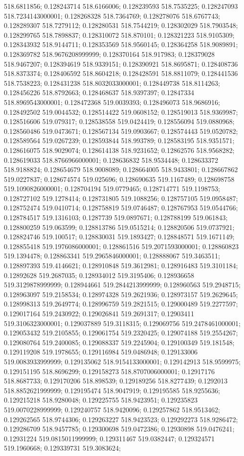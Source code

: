 518.6811856; 0.128243714 518.6166006; 0.128239593 518.7535225; 0.128247093 518.7234143000001; 0.128268328 518.7364769; 0.128278076 518.6767743; 0.128289307 518.7279112; 0.128280531 518.7544219; 0.128302029 518.7903548; 0.128299765 518.7898837; 0.128310072 518.870101; 0.128321223 518.9105309; 0.128343932 518.9144711; 0.128353569 518.9560145; 0.128364258 518.9089891; 0.128369782 518.9676208999999; 0.128370164 518.917983; 0.128379028 518.9467207; 0.128394619 518.9339151; 0.128390921 518.8695871; 0.128408736 518.8373374; 0.128406592 518.8604218; 0.128428591 518.8811079; 0.128441536 518.7538223; 0.128431238 518.8032033000001; 0.128449738 518.8114263; 0.128456226 518.8792663; 0.128468637 518.9397397; 0.12847334 518.8969543000001; 0.128472368 519.0039393; 0.128496073 518.9686916; 0.128492502 519.0044532; 0.128514422 519.0608152; 0.128519013 518.9369987; 0.128516606 519.079317; 0.128538558 519.0424419; 0.128556094 519.0880968; 0.128560486 519.0473671; 0.128567134 519.0903667; 0.128574443 519.0520782; 0.128589564 519.0267239; 0.128593844 518.993789; 0.128583195 518.9351571; 0.128616075 518.9029074; 0.128614138 518.9231652; 0.12862576 518.9568282; 0.128619033 518.8766966000001; 0.128636832 518.9534448; 0.128633372 518.9188824; 0.128654679 518.9008089; 0.128664005 518.9433801; 0.128667862 519.0227837; 0.128674574 519.025696; 0.128690635 519.1167489; 0.128698758 519.1090826000001; 0.128704194 519.0779465; 0.128714771 519.1198753; 0.128727102 519.1278414; 0.128731805 519.1088256; 0.128757105 519.0958487; 0.128752474 519.0410714; 0.128758819 519.0746487; 0.128767953 519.0544766; 0.128784517 519.1316103; 0.1287739 519.0897671; 0.128788199 519.061843; 0.128800259 519.063599; 0.128813786 519.0515214; 0.128820506 519.0737921; 0.128824746 519.100517; 0.128830031 519.1893427; 0.128848571 519.1671149; 0.128855418 519.1976086000001; 0.128861516 519.2071593000001; 0.128860823 519.1394478; 0.128863341 519.2965846000001; 0.128888067 519.3463511; 0.128897393 519.4146621; 0.128910848 519.3612981; 0.128916483 519.3101184; 0.12892628 519.2687035; 0.128934012 519.3195406; 0.128936658 519.3129878999999; 0.128944661 519.2844213999999; 0.128960563 519.2948715; 0.128963097 519.2158534; 0.128974328 519.2621936; 0.128973157 519.2629645; 0.128998313 519.2649774; 0.128996759 519.2821515; 0.129000489 519.2277597; 0.129017164 519.2430922; 0.129026841 519.2691317; 0.12903411 519.3106323000001; 0.129037889 519.3118315; 0.129069756 519.2478461000001; 0.129053432 519.2105855; 0.129061754 519.2320425; 0.129074188 519.2554267; 0.129080764 519.2400085; 0.129088337 519.2245904; 0.129100349 519.181548; 0.129119208 519.1978655; 0.129116984 519.0486948; 0.129133006 519.0083933999999; 0.129135062 518.9154133000001; 0.129142913 518.9599975; 0.129151195 518.8696299; 0.129158273 518.8707006000001; 0.12917176 518.8687733; 0.129170206 518.898539; 0.129189256 518.8277439; 0.1292013 518.8852621999999; 0.129195474 518.9047919; 0.129195585 518.9255636; 0.129215218 518.9280048; 0.129225755 518.9423951; 0.129235823 519.0070228999999; 0.129240757 518.9420096; 0.129257862 518.9513462; 0.129262565 518.9744306; 0.129263227 518.9423523; 0.129292273 518.9286472; 0.129286709 518.9457785; 0.129300698 519.0472386; 0.12930898 519.0476241; 0.12931224 519.0815011999999; 0.129311467 519.0382447; 0.129324571 519.1960668; 0.129339731 519.3083624; 